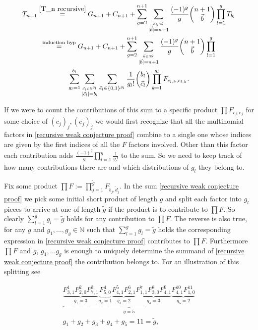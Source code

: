 \documentclass[b5paper,draft,openbib,12pt]{memoir}
\begin{document}
\begin{multline}\label{recursive weak conjecture proof}
T_{n+1} \stackrel{\eqref{T_n recursive}}{=} 
G_{n+1} + C_{n+1}+ \sum_{g=2}^{n+1} \sum_{\stackrel{\vec{b}\in\mathbb{N}^g}{|\vec{b}|=n+1}} 
\frac{(-1)^g}{g} \binom{n+1}{\vec{b}} \prod_{l=1}^g T_{b_l}\\
\stackrel{\text{induction hyp}}{=} G_{n+1} + C_{n+1}+ \sum_{g=2}^{n+1} \sum_{\stackrel{\vec{b}\in\mathbb{N}^g}{|\vec{b}|=n+1}} 
\frac{(-1)^g}{g} \binom{n+1}{\vec{b}} \prod_{l=1}^g \\
\sum_{g_l=1}^{b_l} \sum_{\stackrel{\vec{c}_l \in\mathbb{N}^{g_l}}{|\vec{c}_l|=b_l}} \sum_{\vec{e}_l \in \{0,1\}^{g_l}}
\frac{1}{g_l!} \binom{b_l}{\vec{c}_l} \prod_{k=1}^{g_l} F_{c_{l,k},e_{l,k}}.
\end{multline}

If we were to count the contributions of this sum to a specific product \(\prod F_{c_j,e_j}\) for some choice of 
\((c_j)_j, (e_j)_j\) we would first recognize that all the multinomial factors in \eqref{recursive weak conjecture proof}
combine to a single one whose indices are given by the first indices of all the \(F\) factors involved.
Other than this factor each contribution adds \(\frac{(-1)^g}{g} \prod_{l=1}^g \frac{1}{g_l!}\) to the sum. So we 
need to keep track of how many contributions there are and which distributions of \(g_l\) they belong to. 

Fix some product \(\prod F :=\prod_{j=1}^{\tilde{g}} F_{\tilde{b}_j,\tilde{d}_j}\). In the sum 
\eqref{recursive weak conjecture proof} we pick some initial short product of length \(g\) and split each
factor into \(g_l\) pieces to arrive at one of length \(\tilde{g}\) if the product is to contribute to
\(\prod F\). So clearly \(\sum_{l=1}^g g_l = \tilde{g}\) holds for any contribution to \(\prod F\). 
The reverse is also true, for any
\(g\) and \(g_1, \dots, g_g\in\mathbb{N}\) such that \(\sum_{l=1}^g g_l=\tilde{g}\) holds
the corresponding expression in \eqref{recursive weak conjecture proof} contributes to 
\(\prod F\). Furthermore \(\prod F\) and \(g\), \(g_1,\dots g_g\) is enough to uniquely
determine the summand of \eqref{recursive weak conjecture proof} the contribution
belongs to. For an illustration of this splitting see

\begin{align*}
\underbrace{\underbrace{F^1_{3,1} F^2_{2,0} F^3_{7,1}}_{g_1=3} \underbrace{F^4_{5,0}}_{g_2=1} \underbrace{F^5_{4,1} F^6_{2,1}}_{g_3=2} \underbrace{F^7_{1,1} F^8_{3,0} F^9_{4,1}}_{g_4=3} \underbrace{F^{10}_{4,1} F^{11}_{1,0}}_{g_5=2}}_{g=5}\\
 g_1+g_2+g_3+g_4+g_5=11=\tilde{g},
\end{align*}
\end{document}
